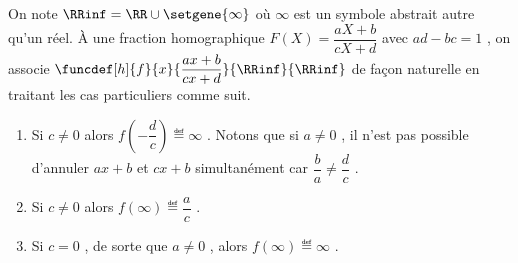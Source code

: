 On note $\RRinf = \RR \cup \setgene{\infty}$ où $\infty$ est un symbole abstrait autre qu'un réel.
À une fraction homographique $F(X) = \dfrac{a X + b}{c X + d}$ avec $ad- bc = 1$ , on associe
$\funcdef[h]{f}{x}     {\dfrac{a x + b}{c x + d}}%
               {\RRinf}{\RRinf}$
de façon naturelle en traitant les cas particuliers comme suit.

\begin{enumerate}
	\item Si $c \neq 0$ alors $f\left(- \dfrac{d}{c} \right) \eqdef \infty$ .
	      Notons que si $a \neq 0$ , il n'est pas possible d'annuler $ax + b$ et $cx + b$ simultanément car $\dfrac{b}{a} \neq \dfrac{d}{c}$ .

	\item Si $c \neq 0$ alors $f(\infty) \eqdef \dfrac{a}{c}$ .

	\item Si $c = 0$ , de sorte que $a \neq 0$ , alors $f(\infty) \eqdef \infty$ .
\end{enumerate}

